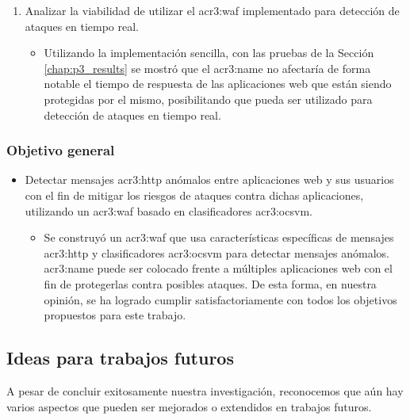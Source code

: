 \begin{enumerate}
    \item
    Analizar la viabilidad de utilizar el \gls{acr3:waf} implementado
    para detección de ataques en tiempo real.

    \begin{itemize}
        \item
        Utilizando la implementación sencilla, con las pruebas de la Sección
        \ref{chap:p3_results} se mostró que el \gls{acr3:name} no
        afectaría de forma notable el tiempo de respuesta de las
        aplicaciones web que están siendo protegidas por el mismo,
        posibilitando que pueda ser utilizado para detección de
        ataques en tiempo real.
    \end{itemize}
\end{enumerate}


\subsubsection{Objetivo general}

\begin{itemize}
    \item
    Detectar mensajes \gls{acr3:http} anómalos entre aplicaciones web
    y sus usuarios con el fin de mitigar los riesgos de ataques contra
    dichas aplicaciones, utilizando un \gls{acr3:waf} basado en
    clasificadores \gls{acr3:ocsvm}.

    \begin{itemize}
        \item
        Se construyó un \gls{acr3:waf} que usa características
        específicas de mensajes \gls{acr3:http} y clasificadores
        \gls{acr3:ocsvm} para detectar mensajes anómalos.
        \gls{acr3:name} puede ser colocado frente a múltiples
        aplicaciones web con el fin de protegerlas contra posibles
        ataques.
        De esta forma, en nuestra opinión, se ha logrado cumplir
        satisfactoriamente con todos los objetivos propuestos para
        este trabajo.
    \end{itemize}
\end{itemize}


\subsection{Ideas para trabajos futuros}

A pesar de concluir exitosamente nuestra investigación, reconocemos que
aún hay varios aspectos que pueden ser mejorados o extendidos en trabajos
futuros.

